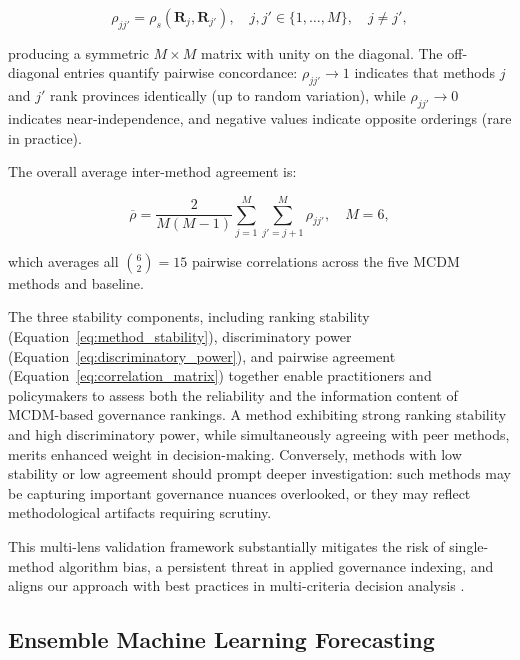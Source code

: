 \documentclass[12pt,a4paper]{article}
\begin{document}
\begin{equation}
\label{eq:correlation_matrix}
\rho_{jj'} = \rho_s(\mathbf{R}_j, \mathbf{R}_{j'}), \quad j, j' \in \{1, \ldots, M\}, \quad j \neq j',
\end{equation}

producing a symmetric $M \times M$ matrix with unity on the diagonal. The off-diagonal entries quantify pairwise concordance: $\rho_{jj'} \to 1$ indicates that methods $j$ and $j'$ rank provinces identically (up to random variation), while $\rho_{jj'} \to 0$ indicates near-independence, and negative values indicate opposite orderings (rare in practice).

The overall average inter-method agreement is:

\begin{equation}
\label{eq:average_agreement}
\overline{\rho} = \frac{2}{M(M-1)} \sum_{j=1}^{M} \sum_{j'=j+1}^{M} \rho_{jj'}, \quad M = 6,
\end{equation}

which averages all $\binom{6}{2} = 15$ pairwise correlations across the five MCDM methods and baseline.

The three stability components, including ranking stability (Equation~\ref{eq:method_stability}), discriminatory power (Equation~\ref{eq:discriminatory_power}), and pairwise agreement (Equation~\ref{eq:correlation_matrix}) together enable practitioners and policymakers to assess both the reliability and the information content of MCDM-based governance rankings. A method exhibiting strong ranking stability and high discriminatory power, while simultaneously agreeing with peer methods, merits enhanced weight in decision-making. Conversely, methods with low stability or low agreement should prompt deeper investigation: such methods may be capturing important governance nuances overlooked, or they may reflect methodological artifacts requiring scrutiny.

This multi-lens validation framework substantially mitigates the risk of single-method algorithm bias, a persistent threat in applied governance indexing, and aligns our approach with best practices in multi-criteria decision analysis \citep{Roy1996, Brans1985}.

\subsection{Ensemble Machine Learning Forecasting}
\label{subsec:ensemble_forecasting}

\end{document}

